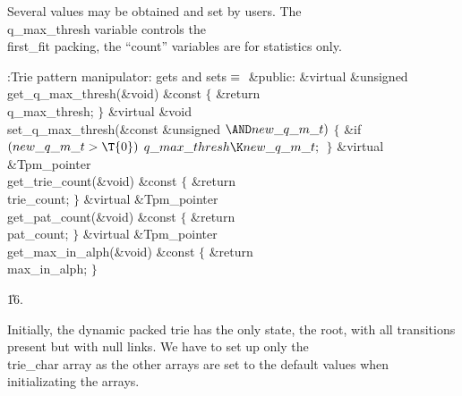 Several values may be obtained and set by users. The \\{q\_max\_thresh}
variable controls the \\{first\_fit} packing, the ``count'' variables are
for statistics only.

\Y\B\4:Trie pattern manipulator: gets and sets\X${}\equiv{}$\6
\4\&{public}:\6
\&{virtual} \&{unsigned} \\{get\_q\_max\_thresh}(\&{void}) \&{const}\1\1\2\2\6
${}\{{}$\1\6
\&{return} \\{q\_max\_thresh};\6
\4${}\}{}$\2\7
\&{virtual} \&{void} \\{set\_q\_max\_thresh}(\&{const} \&{unsigned} ${}{\AND}%
\\{new\_q\_m\_t}){}$\1\1\2\2\6
${}\{{}$\1\6
\&{if} ${}(\\{new\_q\_m\_t}>\T{0}){}$\1\5
${}\\{q\_max\_thresh}\K\\{new\_q\_m\_t};{}$\2\6
\4${}\}{}$\2\7
\&{virtual} \&{Tpm\_pointer} \\{get\_trie\_count}(\&{void}) \&{const}\6
${}\{{}$\1\6
\&{return} \\{trie\_count};\6
\4${}\}{}$\2\7
\&{virtual} \&{Tpm\_pointer} \\{get\_pat\_count}(\&{void}) \&{const}\6
${}\{{}$\1\6
\&{return} \\{pat\_count};\6
\4${}\}{}$\2\7
\&{virtual} \&{Tpm\_pointer} \\{get\_max\_in\_alph}(\&{void}) \&{const}\6
${}\{{}$\1\6
\&{return} \\{max\_in\_alph};\6
\4${}\}{}$\2\par
\U16.\fi

Initially, the dynamic packed trie has the only state, the root, with
all transitions present but with null links. We have to set up only the
\\{trie\_char} array as the other arrays are set to the default values when
initializating the arrays.

